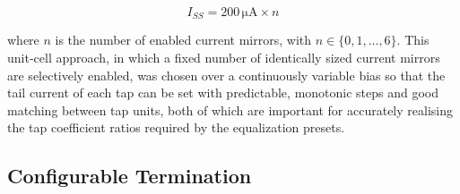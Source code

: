 \begin{equation}
I_{SS} = 200\,\mathrm{\mu A} \times n
\label{eq:tail_current_steps}
\end{equation}

where $n$ is the number of enabled current mirrors, with $n \in \{0, 1, \dots, 6\}$. This unit-cell approach, in which a fixed number of identically sized current mirrors are selectively enabled, was chosen over a continuously variable bias so that the tail current of each tap can be set with predictable, monotonic steps and good matching between tap units, both of which are important for accurately realising the tap coefficient ratios required by the equalization presets.%


\subsection{Configurable Termination}\label{sec:termination_control}


